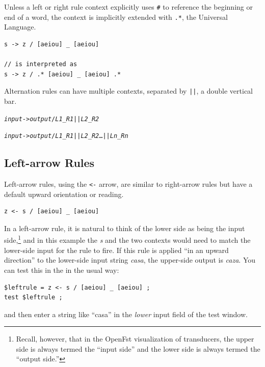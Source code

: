Unless a left or right rule context explicitly uses \verb!#! to reference the
beginning or end of a word, the context is implicitly extended with
\verb!.*!, the Universal Language.

\begin{Verbatim}
s -> z / [aeiou] _ [aeiou]

// is interpreted as
s -> z / .* [aeiou] _ [aeiou] .*
\end{Verbatim}



Alternation rules can have multiple contexts, separated by \texttt{||}, a double vertical bar.

\begin{alltt}
\emph{input} -> \emph{output} / \emph{L1} _ \emph{R1} || \emph{L2} _ \emph{R2}

\emph{input} -> \emph{output} / \emph{L1} _ \emph{R1} || \emph{L2} _ \emph{R2} \ldots || \emph{Ln} _ \emph{Rn}
\end{alltt}

\subsection{Left-arrow Rules}

Left-arrow rules, using the \texttt{<-} arrow, are similar to right-arrow
rules but have a default upward orientation or reading.

\begin{Verbatim}
z <- s / [aeiou] _ [aeiou]
\end{Verbatim}

\noindent
In a left-arrow rule, it is natural to think of the lower side as being the input side,\footnote{Recall,
however, that in the OpenFst visualization of transducers, the upper side is always termed the ``input
side'' and the lower side is always termed the ``output side.''} and in this example the
\emph{s} and
the two contexts would need to match the lower-side input for the rule to fire.  If this rule is
applied ``in an upward direction'' to the lower-side input string \emph{casa}, the upper-side output
is \emph{caza}.  You can test this in the  in the usual way:


\begin{Verbatim}
$leftrule = z <- s / [aeiou] _ [aeiou] ;
test $leftrule ;
\end{Verbatim}

\noindent
and then enter a string like ``casa'' in the \emph{lower} input field of the test window.


